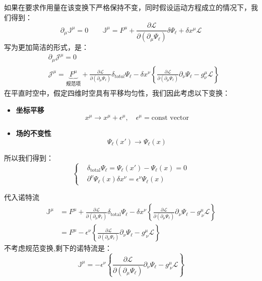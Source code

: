 如果在要求作用量在该变换下严格保持不变，同时假设运动方程成立的情况下，我们得到：
\begin{equation*}
    \partial_\mu \mathbb{J}^\mu=0\qquad
    \mathbb{J}^\mu = F^\mu +\frac{\partial \mathscr{L}}{\partial (\partial_\mu \Psi_\ell)}\delta\Psi_\ell
+ \delta x^\mu \mathscr{L} 
\end{equation*}
写为更加简洁的形式，是：
  \begin{equation}\label{3.3}
      \begin{aligned}
        &\partial_\mu \mathcal{J}^\mu=0\\
        &\mathcal{J}^\mu=\underbrace{F^\mu}_\text{规范项}+\frac{\partial \mathscr{L}}{\partial (\partial_\mu \Psi_\ell)}\delta_{total}\Psi_\ell
        -\delta x^\nu\left\{\frac{\partial \mathscr{L}}{\partial (\partial_\mu \Psi_\ell)}\partial_\nu\Psi_\ell-g^\mu_\nu \mathscr{L} \right\}
      \end{aligned}
\end{equation}
在平直时空中，假定四维时空具有平移均匀性，我们因此考虑以下变换：
  \begin{itemize}
  \item \textbf{坐标平移}
  \begin{equation*}
    x^\mu \rightarrow x^\mu + \epsilon^\mu, \quad \epsilon^\mu = \text{const vector}
  \end{equation*}
  \item \textbf{场的不变性}
  \begin{equation*}
    \Psi_\ell (x') \rightarrow \Psi_\ell(x)
  \end{equation*}
\end{itemize}
所以我们得到：
\begin{equation*}
\left\{
  \begin{aligned}
    &\delta_{\text{total}} \Psi_\ell = \Psi_\ell (x') - \Psi_\ell(x) = 0 \\
    &\partial^\nu \Psi_\ell(x) \delta x^\nu = \epsilon^\nu \Psi_\ell(x)
  \end{aligned}
\right.  
\end{equation*}

代入诺特流
\begin{align*}
  \mathbb{J}^\mu &= 
  F^\mu + \frac{\partial \mathscr{L}}{\partial (\partial_\mu \Psi_\ell)} \delta_{\text{total}} \Psi_\ell
  - \delta x^\nu \left\{
  \frac{\partial \mathscr{L}}{\partial (\partial_\mu \Psi_\ell)} \partial_\nu \Psi_\ell
  - g^\mu_{\ \nu} \mathscr{L} \right\} \\
  &= F^\mu - \epsilon^\nu \left\{
  \frac{\partial \mathscr{L}}{\partial (\partial_\mu \Psi_\ell)} \partial_\nu \Psi_\ell
  - g^\mu_{\ \nu} \mathscr{L} \right\}
\end{align*}
不考虑规范变换,剩下的诺特流是：
\begin{equation*}
    \mathbb{J}^\mu = -\epsilon^\nu \left\{
    \frac{\partial \mathcal{L}}{\partial (\partial_\mu \Psi_\ell)} \partial_\nu \Psi_\ell
    - g^\mu_{\ \nu} \mathscr{L} \right\}
\end{equation*}


